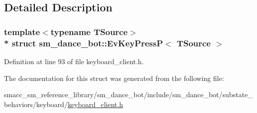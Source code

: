 \subsection{Detailed Description}
\subsubsection*{template$<$typename T\+Source$>$\\*
struct sm\+\_\+dance\+\_\+bot\+::\+Ev\+Key\+Press\+P$<$ T\+Source $>$}



Definition at line 93 of file keyboard\+\_\+client.\+h.



The documentation for this struct was generated from the following file\+:\begin{DoxyCompactItemize}
\item 
smacc\+\_\+sm\+\_\+reference\+\_\+library/sm\+\_\+dance\+\_\+bot/include/sm\+\_\+dance\+\_\+bot/substate\+\_\+behaviors/keyboard/\hyperlink{keyboard__client_8h}{keyboard\+\_\+client.\+h}\end{DoxyCompactItemize}
